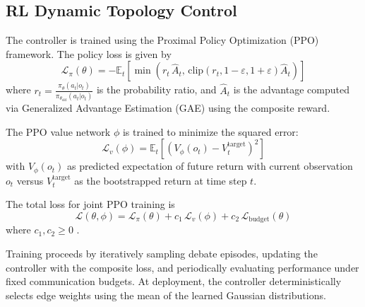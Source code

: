 


\subsection{RL Dynamic Topology Control}

The controller is trained using the Proximal Policy Optimization (PPO) framework. The policy loss is given by
\begin{equation}
\mathcal{L}_\pi(\theta) = - \mathbb{E}_t \left[ \min\left( r_t\,\hat{A}_t,\, \mathrm{clip}(r_t, 1-\varepsilon, 1+\varepsilon)\hat{A}_t \right) \right]
\end{equation}
where $r_t = \frac{\pi_\theta(a_t|o_t)}{\pi_{\theta_\mathrm{old}}(a_t|o_t)}$ is the probability ratio, and $\hat{A}_t$ is the advantage computed via Generalized Advantage Estimation (GAE) using the composite reward. 

The PPO value network $\phi$ is trained to minimize the squared error:
\begin{equation}
\mathcal{L}_v(\phi) = \mathbb{E}_t \left[ (V_\phi(o_t) - V_t^\mathrm{target})^2 \right]
\end{equation}
with $V_\phi(o_t)$ as predicted expectation of future return with current observation $o_t$ versus $V_t^\mathrm{target}$ as the bootstrapped return at time step $t$. 

The total loss for joint PPO training is
\begin{equation}
\mathcal{L}(\theta, \phi) = \mathcal{L}_\pi(\theta) + c_1\,\mathcal{L}_v(\phi) + c_2\,\mathcal{L}_\mathrm{budget}(\theta)
\end{equation}
where $c_1, c_2 \geq 0$ .

Training proceeds by iteratively sampling debate episodes, updating the controller with the composite loss, and periodically evaluating performance under fixed communication budgets. At deployment, the controller deterministically selects edge weights using the mean of the learned Gaussian distributions.

